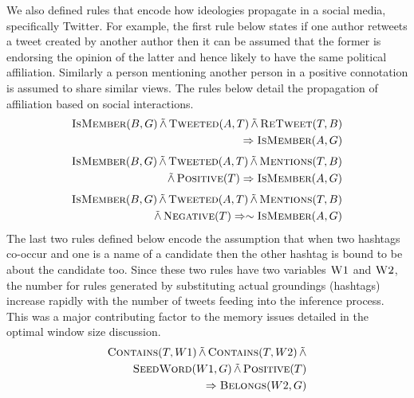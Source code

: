 We also defined rules that encode how ideologies propagate in a social media, specifically Twitter.
For example, the first rule below states if one author retweets a tweet created by another author then it can be assumed that the former is endorsing the opinion of the latter and hence likely to have the same political affiliation. 
Similarly a person mentioning another person in a positive connotation is assumed to share similar views.
The rules below detail the propagation of affiliation based on social interactions.
\begin{align*}
\begin{split}
\textsc{IsMember}(B,G) 
	\softand \textsc{Tweeted}(A,T)
	\softand \textsc{ReTweet}(T,B)\\
	\Rightarrow \textsc{IsMember}(A,G)
\end{split}
\end{align*}
\begin{align*}
\begin{split}
\textsc{IsMember}(B,G) 
	\softand \textsc{Tweeted}(A,T)
	\softand \textsc{Mentions}(T,B)\\
	\softand \textsc{Positive}(T)
	\Rightarrow \textsc{IsMember}(A,G)
\end{split}
\end{align*}
\begin{align*}
\begin{split}
\textsc{IsMember}(B,G) 
	\softand \textsc{Tweeted}(A,T)
	\softand \textsc{Mentions}(T,B)\\
	\softand \textsc{Negative}(T)
	\Rightarrow \sim \textsc{IsMember}(A,G)
\end{split}
\end{align*}
The last two rules defined below encode the assumption that when two hashtags co-occur and one is a name of a candidate then the other hashtag is bound to be about the candidate too.
Since these two rules have two variables $\textsc{W1}$ and $\textsc{W2}$, the number for rules generated by substituting actual groundings (hashtags) increase rapidly with the number of tweets feeding into the inference process. 
This was a major contributing factor to the memory issues detailed in the optimal window size discussion.
\begin{align*}
\begin{split}
\textsc{Contains}(T,W1)
 \softand \textsc{Contains}(T,W2)
  \softand \\
   \textsc{SeedWord}(W1,G)
  \softand \textsc{Positive}(T) \\
	\Rightarrow \textsc{Belongs}(W2,G)
\end{split}
\end{align*}

